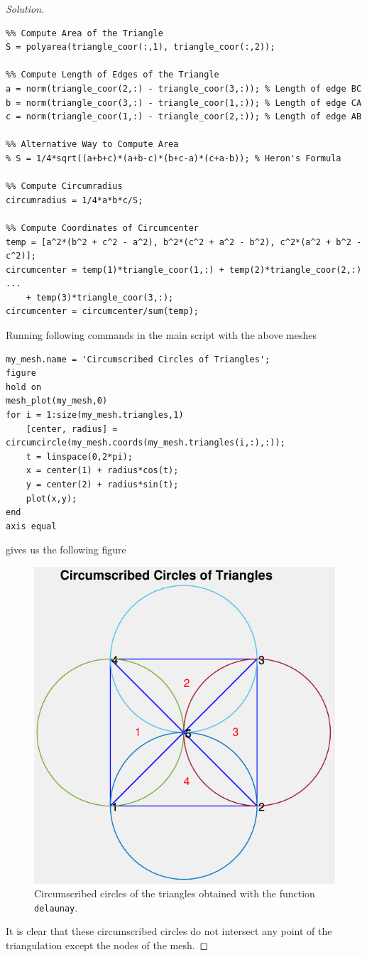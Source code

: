 \documentclass[11pt,a4paper,center,notitlepage]{article}
\numberwithin{equation}{section}
\begin{document}
\begin{proof}[Solution]
\begin{verbatim}
%% Compute Area of the Triangle
S = polyarea(triangle_coor(:,1), triangle_coor(:,2));

%% Compute Length of Edges of the Triangle
a = norm(triangle_coor(2,:) - triangle_coor(3,:)); % Length of edge BC
b = norm(triangle_coor(3,:) - triangle_coor(1,:)); % Length of edge CA
c = norm(triangle_coor(1,:) - triangle_coor(2,:)); % Length of edge AB

%% Alternative Way to Compute Area
% S = 1/4*sqrt((a+b+c)*(a+b-c)*(b+c-a)*(c+a-b)); % Heron's Formula

%% Compute Circumradius
circumradius = 1/4*a*b*c/S;

%% Compute Coordinates of Circumcenter
temp = [a^2*(b^2 + c^2 - a^2), b^2*(c^2 + a^2 - b^2), c^2*(a^2 + b^2 - c^2)];
circumcenter = temp(1)*triangle_coor(1,:) + temp(2)*triangle_coor(2,:) ...
    + temp(3)*triangle_coor(3,:);
circumcenter = circumcenter/sum(temp);
\end{verbatim}
Running following commands in the main script with the above meshes
\begin{verbatim}
my_mesh.name = 'Circumscribed Circles of Triangles';
figure
hold on
mesh_plot(my_mesh,0)
for i = 1:size(my_mesh.triangles,1)
    [center, radius] = circumcircle(my_mesh.coords(my_mesh.triangles(i,:),:));
    t = linspace(0,2*pi);
    x = center(1) + radius*cos(t);
    y = center(2) + radius*sin(t);
    plot(x,y);
end
axis equal
\end{verbatim}
gives us the following figure
\begin{figure}[H]
\centering
\includegraphics[scale=0.6]{9}
\caption{Circumscribed circles of the triangles obtained with the function \texttt{delaunay}.}
\label{fig9}
\end{figure}
It is clear that these circumscribed circles do not intersect any point of the triangulation except the nodes of the mesh.
\end{proof}
\end{document}
